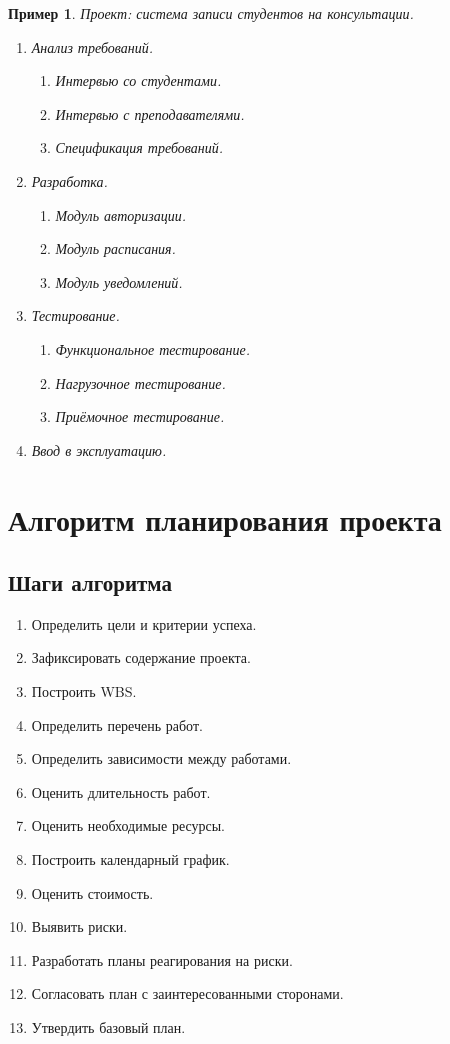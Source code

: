 \documentclass[12pt,a4paper]{article}
\newtheorem{example}{Пример}
\begin{document}
\begin{example}
Проект: система записи студентов на консультации.

\begin{enumerate}
    \item Анализ требований.
    \begin{enumerate}
        \item Интервью со студентами.
        \item Интервью с преподавателями.
        \item Спецификация требований.
    \end{enumerate}
    \item Разработка.
    \begin{enumerate}
        \item Модуль авторизации.
        \item Модуль расписания.
        \item Модуль уведомлений.
    \end{enumerate}
    \item Тестирование.
    \begin{enumerate}
        \item Функциональное тестирование.
        \item Нагрузочное тестирование.
        \item Приёмочное тестирование.
    \end{enumerate}
    \item Ввод в эксплуатацию.
\end{enumerate}
\end{example}

\section{Алгоритм планирования проекта}

\subsection{Шаги алгоритма}

\begin{enumerate}
    \item Определить цели и критерии успеха.
    \item Зафиксировать содержание проекта.
    \item Построить WBS.
    \item Определить перечень работ.
    \item Определить зависимости между работами.
    \item Оценить длительность работ.
    \item Оценить необходимые ресурсы.
    \item Построить календарный график.
    \item Оценить стоимость.
    \item Выявить риски.
    \item Разработать планы реагирования на риски.
    \item Согласовать план с заинтересованными сторонами.
    \item Утвердить базовый план.
\end{enumerate}
\end{document}
